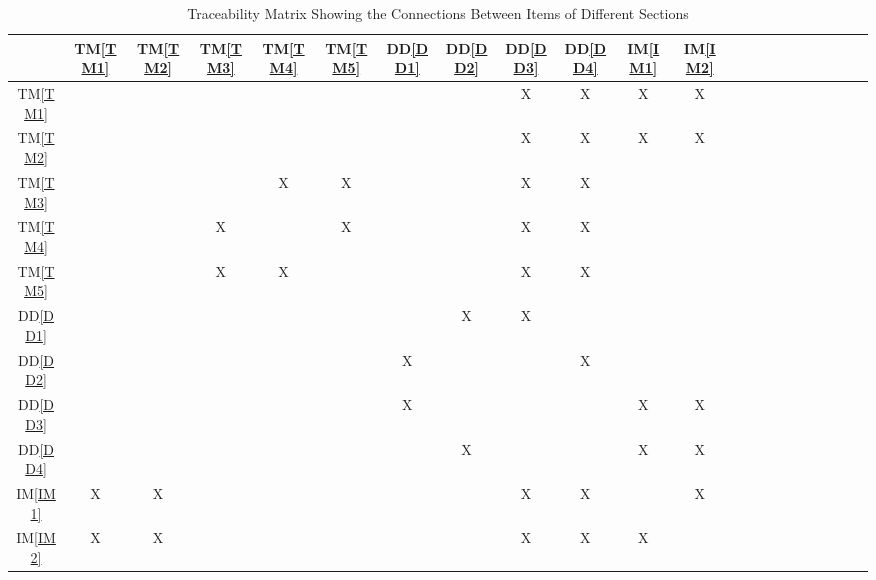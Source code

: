 \documentclass[12pt]{article}
\newcommand{\ddref}[1]{DD\ref{#1}}
\newcommand{\tref}[1]{TM\ref{#1}}
\newcommand{\iref}[1]{IM\ref{#1}}
\begin{document}
\begin{table}[h!]
  \centering
  \begin{tabular}{|c|c|c|c|c|c|c|c|c|c|c|c|c|c|c|c|c|c|c|c|c|c|}
    \hline
                & \tref{TM1} & \tref{TM2} & \tref{TM3} & \tref{TM4} & \tref{TM5} & \ddref{DD1} & \ddref{DD2} & \ddref{DD3} & \ddref{DD4} & \iref{IM1} & \iref{IM2} \\
    \hline
    \tref{TM1}  &            &            &            &            &            &             &             & X           & X           & X          & X          \\ \hline
    \tref{TM2}  &            &            &            &            &            &             &             & X           & X           & X          & X          \\ \hline
    \tref{TM3}  &            &            &            & X          & X          &             &             & X           & X           &            &            \\ \hline
    \tref{TM4}  &            &            & X          &            & X          &             &             & X           & X           &            &            \\ \hline
    \tref{TM5}  &            &            & X          & X          &            &             &             & X           & X           &            &            \\ \hline
    \ddref{DD1} &            &            &            &            &            &             & X           & X           &             &            &            \\ \hline
    \ddref{DD2} &            &            &            &            &            & X           &             &             & X           &            &            \\ \hline
    \ddref{DD3} &            &            &            &            &            & X           &             &             &             & X          & X          \\ \hline
    \ddref{DD4} &            &            &            &            &            &             & X           &             &             & X          & X          \\ \hline
    \iref{IM1}  & X          & X          &            &            &            &             &             & X           & X           &            & X          \\ \hline
    \iref{IM2}  & X          & X          &            &            &            &             &             & X           & X           & X          &            \\ \hline
  \end{tabular}
  \caption{Traceability Matrix Showing the Connections Between Items of Different Sections}
  \label{Table:trace}
\end{table}
\end{document}
